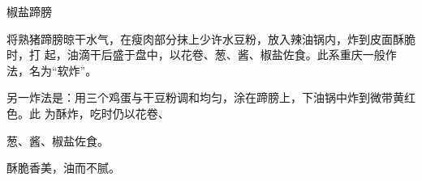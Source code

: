 \begin{recipe}{椒盐蹄膀}

\ingredients


\cooking

将熟猪蹄膀晾干水气，在瘦肉部分抹上少许水豆粉，放入辣油锅内，炸到皮面酥脆时，打
起，油滴干后盛于盘中，以花卷、葱、酱、椒盐佐食。此系重庆一般作法，名为“软炸”。

另一炸法是：用三个鸡蛋与干豆粉调和均匀，涂在蹄膀上，下油锅中炸到微带黄红色。此
为酥炸，吃时仍以花卷、

葱、酱、椒盐佐食。

\features

酥脆香美，油而不腻。

\end{recipe}

